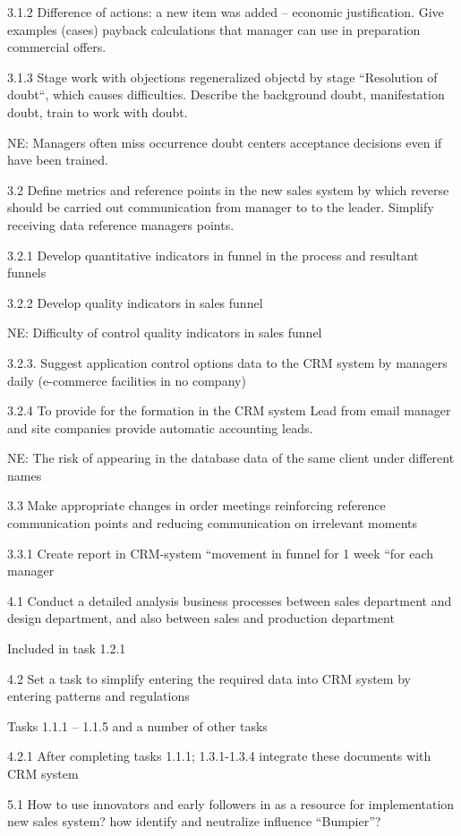 \documentclass[11pt,a4paper]{book}
\begin{document}
3.1.2 Difference of actions: a new item was added -- economic justification.
Give examples (cases) payback calculations that manager can use in preparation
commercial offers.

3.1.3 Stage work with objections regeneralized objectd by stage “Resolution of doubt“,
which causes difficulties. Describe the background doubt, manifestation doubt,
train to work with doubt.

NE: Managers often miss occurrence doubt centers acceptance decisions even if
have been trained.

3.2 Define metrics and reference points in the new sales system by which
reverse should be carried out communication from manager to to the leader.
Simplify receiving data reference managers points.

3.2.1 Develop quantitative indicators in funnel in the process and resultant
funnels

3.2.2 Develop quality indicators in sales funnel

NE: Difficulty of control quality indicators in sales funnel

3.2.3. Suggest application control options data to the CRM system by managers
daily (e-commerce facilities in no company)

3.2.4 To provide for the formation in the CRM system Lead from email manager
and site companies provide automatic accounting leads.

NE: The risk of appearing in the database data of the same client under
different names

3.3 Make appropriate changes in order meetings reinforcing reference
communication points and reducing communication on irrelevant moments

3.3.1 Create report in CRM-system “movement in funnel for 1 week “for each
manager

4.1 Conduct a detailed analysis business processes between sales department
and design department, and also between sales and production department

Included in task 1.2.1

4.2 Set a task to simplify entering the required data into CRM system by
entering patterns and regulations

Tasks 1.1.1 -- 1.1.5 and a number of other tasks

4.2.1 After completing tasks 1.1.1; 1.3.1-1.3.4 integrate these documents with
CRM system

5.1 How to use innovators and early followers in as a resource for
implementation new sales system? how identify and neutralize influence
“Bumpier”?
\end{document}
